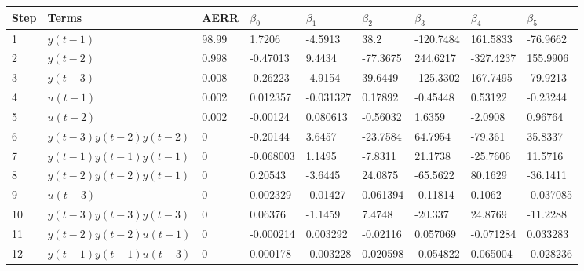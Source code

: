 \begin{tabular}{lllllllll}
Step & Terms & AERR & $\beta_{0}$ & $\beta_{1}$ & $\beta_{2}$ & $\beta_{3}$ & $\beta_{4}$ & $\beta_{5}$ \\ 
\hline 
1 & $y(t-1)$ & 98.99 & 1.7206 & -4.5913 & 38.2 & -120.7484 & 161.5833 & -76.9662 \\ 
2 & $y(t-2)$ & 0.998 & -0.47013 & 9.4434 & -77.3675 & 244.6217 & -327.4237 & 155.9906 \\ 
3 & $y(t-3)$ & 0.008 & -0.26223 & -4.9154 & 39.6449 & -125.3302 & 167.7495 & -79.9213 \\ 
4 & $u(t-1)$ & 0.002 & 0.012357 & -0.031327 & 0.17892 & -0.45448 & 0.53122 & -0.23244 \\ 
5 & $u(t-2)$ & 0.002 & -0.00124 & 0.080613 & -0.56032 & 1.6359 & -2.0908 & 0.96764 \\ 
6 & $y(t-3)y(t-2)y(t-2)$ & 0 & -0.20144 & 3.6457 & -23.7584 & 64.7954 & -79.361 & 35.8337 \\ 
7 & $y(t-1)y(t-1)y(t-1)$ & 0 & -0.068003 & 1.1495 & -7.8311 & 21.1738 & -25.7606 & 11.5716 \\ 
8 & $y(t-2)y(t-2)y(t-1)$ & 0 & 0.20543 & -3.6445 & 24.0875 & -65.5622 & 80.1629 & -36.1411 \\ 
9 & $u(t-3)$ & 0 & 0.002329 & -0.01427 & 0.061394 & -0.11814 & 0.1062 & -0.037085 \\ 
10 & $y(t-3)y(t-3)y(t-3)$ & 0 & 0.06376 & -1.1459 & 7.4748 & -20.337 & 24.8769 & -11.2288 \\ 
11 & $y(t-2)y(t-2)u(t-1)$ & 0 & -0.000214 & 0.003292 & -0.02116 & 0.057069 & -0.071284 & 0.033283 \\ 
12 & $y(t-1)y(t-1)u(t-3)$ & 0 & 0.000178 & -0.003228 & 0.020598 & -0.054822 & 0.065004 & -0.028236 \\ 
\hline 
\end{tabular}